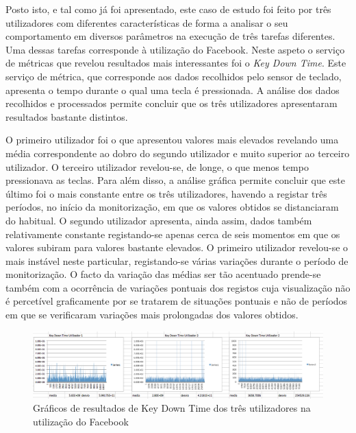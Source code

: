 Posto isto, e tal como já foi apresentado, este caso de estudo foi feito por três utilizadores com diferentes características de forma a analisar o seu comportamento em diversos parâmetros na execução de três tarefas diferentes. Uma dessas tarefas corresponde à utilização do Facebook. Neste aspeto o serviço de métricas que revelou resultados mais interessantes foi  o \textit{Key Down Time}. Este serviço de métrica, que corresponde aos dados recolhidos pelo sensor de teclado, apresenta o tempo durante o qual uma tecla é pressionada. A análise dos dados recolhidos e processados permite concluir que os três utilizadores apresentaram resultados bastante distintos.

O primeiro utilizador foi o que apresentou valores mais elevados revelando uma média correspondente ao dobro do segundo utilizador e muito superior ao terceiro utilizador. O terceiro utilizador revelou-se, de longe, o que menos tempo pressionava as teclas. Para além disso, a análise gráfica permite concluir que este último foi o mais constante entre os três utilizadores, havendo a registar três períodos, no início da monitorização, em que os valores obtidos se distanciaram do habitual. O segundo utilizador apresenta, ainda assim, dados também relativamente constante registando-se apenas cerca de seis momentos em que os valores subiram para valores bastante elevados. O primeiro utilizador revelou-se o mais instável neste particular, registando-se várias variações durante o período de monitorização. O facto da variação das médias ser tão acentuado prende-se também com a ocorrência de variações pontuais dos registos cuja visualização não é percetível graficamente por se tratarem de situações pontuais e não de períodos em que se verificaram variações mais prolongadas dos valores obtidos.

\begin{figure}[htb]
   \centering
   \includegraphics[scale=0.3]{Images/keydowntime.png}
   \caption{Gráficos de resultados de Key Down Time dos três utilizadores na utilização do Facebook}
\end{figure}

